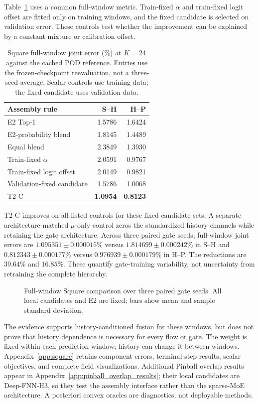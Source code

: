 Table~\ref{tab:routing_fusion} uses a common full-window metric.
Train-fixed $\alpha$ and train-fixed logit offset are fitted only
on training windows, and the fixed candidate is selected on
validation error. These controls test whether the improvement
can be explained by a constant mixture or calibration offset.

\begin{table}[H]
\centering
\small
\caption{Square full-window joint error (\%) at $K=24$ against the
cached POD reference. Entries use the frozen-checkpoint reevaluation,
not a three-seed average. Scalar controls use training data;
the fixed candidate uses validation data.}
\label{tab:routing_fusion}
\begin{tabular}{@{}lrr@{}}
\toprule
Assembly rule & S--H & H--P\\
\midrule
E2 Top-1 & 1.5786 & 1.6424\\
E2-probability blend & 1.8145 & 1.4489\\
Equal blend & 2.3849 & 1.3930\\
Train-fixed $\alpha$ & 2.0591 & 0.9767\\
Train-fixed logit offset & 2.0149 & 0.9821\\
Validation-fixed candidate & 1.5786 & 1.0068\\
T2-C & \textbf{1.0954} & \textbf{0.8123}\\
\bottomrule
\end{tabular}
\end{table}

T2-C improves on all listed controls for these fixed candidate
sets. A separate architecture-matched $\mu$-only control zeros the
standardized history channels while retaining the gate architecture.
Across three paired gate seeds, full-window joint errors are
$1.095351\pm0.000015\%$ versus $1.814699\pm0.000242\%$
in S--H and $0.812343\pm0.000177\%$ versus
$0.976939\pm0.000179\%$ in H--P.
The reductions are $39.64\%$ and $16.85\%$.
These quantify gate-training variability, not uncertainty from
retraining the complete hierarchy.

\begin{figure}[H]
\centering

\caption{Full-window Square comparison over three paired gate seeds.
All local candidates and E2 are fixed; bars show mean and sample
standard deviation.}
\label{fig:square_overlap}
\end{figure}

The evidence supports history-conditioned fusion for these windows,
but does not prove that history dependence is necessary for every
flow or gate. The weight is fixed within each prediction window;
history can change it between windows.
Appendix~\ref{app:square} retains component errors, terminal-step
results, scalar objectives, and complete field visualizations.
Additional Pinball overlap results appear in
Appendix~\ref{app:pinball_overlap_results}; their local candidates
are Deep-FNN-H3, so they test the assembly interface rather than
the sparse-MoE architecture.
A posteriori convex oracles are diagnostics, not deployable methods.

